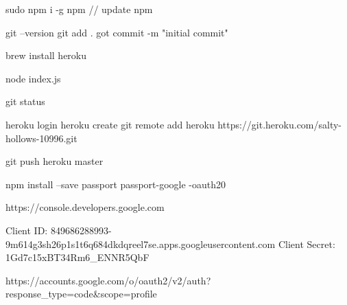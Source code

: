 sudo npm i -g npm  // update npm


git --version
git add .
got commit -m "initial commit"

brew install heroku

node index.js

git status

heroku login
heroku create
git remote add heroku https://git.heroku.com/salty-hollows-10996.git


git push heroku master

npm install --save passport passport-google -oauth20

https://console.developers.google.com

Client ID: 849686288993-9m614g3sh26p1s1t6q684dkdqreel7se.apps.googleusercontent.com
Client Secret: 1Gd7c15xBT34Rm6_ENNR5QbF


https://accounts.google.com/o/oauth2/v2/auth?response_type=code&scope=profile%